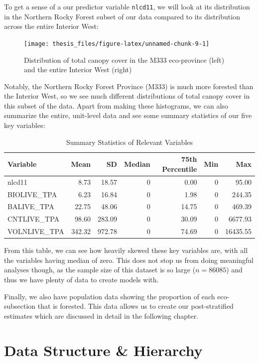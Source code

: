 \documentclass[12pt,twoside]{reedthesis}
\begin{document}
To get a sense of a our predictor variable \texttt{nlcd11}, we will look at its distribution in the Northern Rocky Forest subset of our data compared to its distribution across the entire Interior West:
\begin{figure}

{\centering \texttt{[image: thesis\_files/figure-latex/unnamed-chunk-9-1]} 

}

\caption[Total canopy cover in the M333 eco-province and Interior West]{Distribution of total canopy cover in the M333 eco-province (left) and the entire Interior West (right)}\label{fig:unnamed-chunk-9}
\end{figure}
Notably, the Northern Rocky Forest Province (M333) is much more forested than the Interior West, so we see much different distributions of total canopy cover in this subset of the data. Apart from making these histograms, we can also summarize the entire, unit-level data and see some summary statistics of our five key variables:
\begin{longtable}[t]{lrrrrrr}
\caption[Summary Statistics of Relevant Variables]{\label{tab:unnamed-chunk-10}Summary Statistics of Relevant Variables}\\
\toprule
Variable & Mean & SD & Median & 75th Percentile & Min & Max\\
\midrule
nlcd11 & 8.73 & 18.57 & 0 & 0.00 & 0 & 95.00\\
BIOLIVE\_TPA & 6.23 & 16.84 & 0 & 1.98 & 0 & 244.35\\
BALIVE\_TPA & 22.75 & 48.06 & 0 & 14.75 & 0 & 469.39\\
CNTLIVE\_TPA & 98.60 & 283.09 & 0 & 30.09 & 0 & 6677.93\\
VOLNLIVE\_TPA & 342.32 & 972.78 & 0 & 74.69 & 0 & 16435.55\\
\bottomrule
\end{longtable}
From this table, we can see how heavily skewed these key variables are, with all the variables having median of zero. This does not stop us from doing meaningful analyses though, as the sample size of this dataset is so large (\(n = 86085\)) and thus we have plenty of data to create models with.

Finally, we also have population data showing the proportion of each eco-subsection that is forested. This data allows us to create our post-stratified estimates which are discussed in detail in the following chapter.

\hypertarget{data-structure-hierarchy}{%
\section{Data Structure \& Hierarchy}\label{data-structure-hierarchy}}
\end{document}
